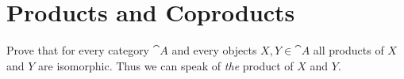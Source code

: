 \def\pathToRoot{../../}



\author{Maximilian Wuttke}


\section{Products and Coproducts}

\begin{exercise}
  Prove that for every category $\cat{A}$ and every objects $X, Y \in \cat{A}$
  all products of $X$ and $Y$ are isomorphic. Thus we can speak of \emph{the} product of $X$ and $Y$.
\end{exercise}

